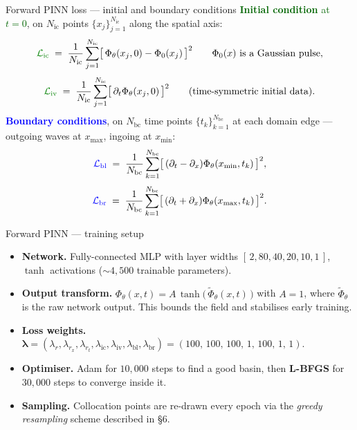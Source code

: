 \documentclass[aspectratio=169, 11pt]{beamer}
\begin{document}
\begin{frame}{Forward PINN loss --- initial and boundary conditions}
  \footnotesize
  \textcolor{darkgreen}{\textbf{Initial condition} at $t=0$}, on
  $N_{\mathrm{ic}}$ points $\{x_{j}\}_{j=1}^{N_{\mathrm{ic}}}$ along
  the spatial axis:
  \[
    \textcolor{darkgreen}{\mathcal{L}_{\mathrm{ic}}}
      \;=\; \frac{1}{N_{\mathrm{ic}}}\sum_{j=1}^{N_{\mathrm{ic}}}
            \bigl[\,\Phi_{\theta}(x_{j},0)-\Phi_{0}(x_{j})\,\bigr]^{2}
    \qquad\Phi_{0}(x)\text{ is a Gaussian pulse},
  \]
  \[
    \textcolor{darkgreen}{\mathcal{L}_{\mathrm{iv}}}
      \;=\; \frac{1}{N_{\mathrm{ic}}}\sum_{j=1}^{N_{\mathrm{ic}}}
            \bigl[\,\partial_{t}\Phi_{\theta}(x_{j},0)\,\bigr]^{2}
    \qquad\text{(time-symmetric initial data)}.
  \]
  \medskip
  \textcolor{blue}{\textbf{Boundary conditions}}, on
  $N_{\mathrm{bc}}$ time points $\{t_{k}\}_{k=1}^{N_{\mathrm{bc}}}$ at each
  domain edge --- outgoing waves at $x_{\max}$, ingoing at $x_{\min}$:
  \[
    \textcolor{blue}{\mathcal{L}_{\mathrm{bl}}}
      \;=\; \frac{1}{N_{\mathrm{bc}}}\sum_{k=1}^{N_{\mathrm{bc}}}
            \bigl[\,(\partial_{t}-\partial_{x})\Phi_{\theta}(x_{\min},t_{k})\,\bigr]^{2},
  \]
  \[
    \textcolor{blue}{\mathcal{L}_{\mathrm{br}}}
      \;=\; \frac{1}{N_{\mathrm{bc}}}\sum_{k=1}^{N_{\mathrm{bc}}}
            \bigl[\,(\partial_{t}+\partial_{x})\Phi_{\theta}(x_{\max},t_{k})\,\bigr]^{2}.
  \]
\end{frame}

\begin{frame}{Forward PINN --- training setup}
  \begin{itemize}
    \item \textbf{Network.} Fully-connected MLP with layer widths
          $[\,2,80,40,20,10,1\,]$, $\tanh$ activations
          ($\sim\!4{,}500$ trainable parameters).
    \item \textbf{Output transform.}
          $\Phi_{\theta}(x,t) = A\,\tanh\!\bigl(\,\widetilde{\Phi}_{\theta}(x,t)\,\bigr)$
          with $A=1$, where $\widetilde{\Phi}_{\theta}$ is the raw network
          output. This bounds the field and stabilises early training.
    \item \textbf{Loss weights.}
          $\boldsymbol{\lambda} =
            (\lambda_{r},\lambda_{r_{x}},\lambda_{r_{t}},
             \lambda_{\mathrm{ic}},\lambda_{\mathrm{iv}},
             \lambda_{\mathrm{bl}},\lambda_{\mathrm{br}})
          = (100,\,100,\,100,\,1,\,100,\,1,\,1)$.
    \item \textbf{Optimiser.} Adam for $10{,}000$ steps to find a good
          basin, then \textbf{L-BFGS} for $30{,}000$ steps to converge
          inside it.
    \item \textbf{Sampling.} Collocation points are re-drawn every
          epoch via the \emph{greedy resampling} scheme described in
          \S 6.
  \end{itemize}
\end{frame}
\end{document}
